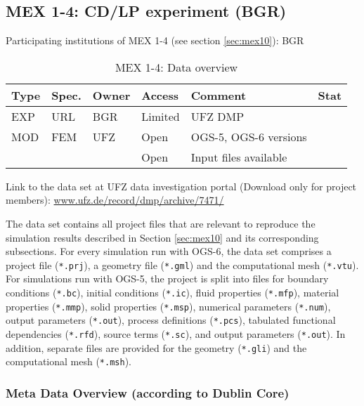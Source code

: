 \subsection{MEX 1-4: CD/LP experiment (BGR)}

Participating institutions of MEX 1-4 (see section \ref{sec:mex10}): BGR

\begin{table}[ht!]
\caption{MEX 1-4: Data overview}
\label{tab:dms-mex14-overview}
\small
\begin{tabular}{l|l|l|l|L{4.7cm}|l}
\hline
{}
Type & Spec. & Owner & Access     & Comment                       & Stat \\ 
\hline
EXP  &  URL  & BGR   & Limited    & UFZ DMP                       &  \\
\hline \hline
MOD  & FEM   & UFZ   & Open       & OGS-5, OGS-6 versions         &  \\
     &       &       & Open       & Input files available         &  \\
%
\hline
\end{tabular}
\end{table}
\normalsize

Link to the data set at UFZ data investigation portal (Download only for project members):
\url{www.ufz.de/record/dmp/archive/7471/}

The data set contains all project files that are relevant to reproduce the simulation results described in Section \ref{sec:mex10} and its corresponding subsections. For every simulation run with OGS-6, the data set comprises a project file (\texttt{*.prj}), a geometry file (\texttt{*.gml}) and the computational mesh (\texttt{*.vtu}). For simulations run with OGS-5, the project is split into files for boundary conditions (\texttt{*.bc}), initial conditions (\texttt{*.ic}), fluid properties (\texttt{*.mfp}), material properties (\texttt{*.mmp}), solid properties (\texttt{*.msp}), numerical parameters (\texttt{*.num}), output parameters (\texttt{*.out}), process definitions (\texttt{*.pcs}), tabulated functional dependencies (\texttt{*.rfd}), source terms (\texttt{*.sc}), and output parameters (\texttt{*.out}). In addition, separate files are provided for the geometry (\texttt{*.gli}) and the computational mesh (\texttt{*.msh}).

\subsubsection*{Meta Data Overview (according to Dublin Core)}

